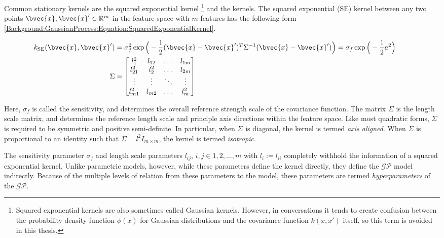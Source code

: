 				Common stationary kernels are the squared exponential kernel \footnote{Squared exponential kernels are also sometimes called Gaussian kernels. However, in conversations it tends to create confusion between the probability density function $\phi(x)$ for Gaussian distributions and the covariance function $k(x, x')$ itself, so this term is avoided in this thesis.} and the \matern kernels. The squared exponential (SE) kernel between any two points $\bvec{x}, \bvec{x}' \in \mathbb{R}^{m}$ in the feature space with $m$ features has the following form \eqref{Background:GaussianProcess:Equation:SquaredExponentialKernel}.
				
				\begin{equation}
					\left.
						\begin{aligned}
							k_{\mathrm{SE}}(\bvec{x}, \bvec{x}') &= \sigma_{f}^{2} \exp\Big(-\frac{1}{2}(\bvec{x} - \bvec{x}')^{T} \Sigma^{-1} (\bvec{x} - \bvec{x}')\Big) = \sigma_{f} \exp\Big(-\frac{1}{2} a^{2} \Big) \\
							\Sigma &= 	\begin{bmatrix}
											l_{1}^{2} & l_{12} & \dots & l_{1m} \\
											l_{21}^{2} & l_{2}^{2} & \dots & l_{2m} \\
											\vdots & \vdots  & \ddots & \vdots \\
											l_{m1}^{2} & l_{m2} & \dots & l_{m}^{2} \\
									  	\end{bmatrix}
						\end{aligned}
					\qquad \right.
				\label{Background:GaussianProcess:Equation:SquaredExponentialKernel}
				\end{equation}
				
				Here, $\sigma_{f}$ is called the sensitivity, and determines the overall reference strength scale of the covariance function. The matrix $\Sigma$ is the length scale matrix, and determines the reference length scale and principle axis directions within the feature space. Like most quadratic forms, $\Sigma$ is required to be symmetric and positive semi-definite. In particular, when $\Sigma$ is diagonal, the kernel is termed \textit{axis aligned}. When $\Sigma$ is proportional to an identity such that $\Sigma = l^{2} I_{m \times m}$, the kernel is termed \textit{isotropic}.
				
				The sensitivity parameter $\sigma_{f}$ and length scale parameters $l_{ij}$, $i, j \in {1, 2, \dots, m}$ with $l_{i} := l_{ii}$ completely withhold the information of a squared exponential kernel. Unlike parametric models, however, while these parameters define the kernel directly, they define the $\mathcal{GP}$ model indirectly. Because of the multiple levels of relation from these parameters to the model, these parameters are termed \textit{hyperparameters} of the $\mathcal{GP}$.
				

